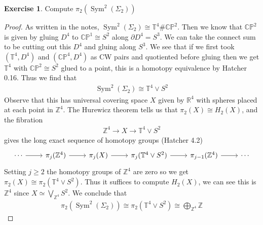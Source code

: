 \documentclass[10.5pt]{article}
\theoremstyle{definition}
\newtheorem{pb}{Exercise}
\numberwithin{proposition}{subsection}
\numberwithin{pb}{subsection}
\begin{document}
    \begin{pb}
        Compute \(\pi_2(\operatorname{Sym}^2(\Sigma_2))\)

        \begin{proof}
            As written in the notes, \(\operatorname{Sym}^2(\Sigma_2) \cong \mathbb{T}^4 \# \mathbb{CP}^2\). Then we know that \(\mathbb{CP}^2\) is given by gluing \(D^4\) to \(\mathbb{CP}^1 \cong S^2\) along \(\partial D^4 = S^3\). We can take the connect sum to be cutting out this \(D^4\) and gluing along \(S^3\). We see that if we first took \((\mathbb{T}^4,D^4)\) and \((\mathbb{CP}^4,D^4)\) as CW pairs and quotiented before gluing then we get \(\mathbb{T}^4\) with \(\mathbb{CP}^2 \cong S^2\) glued to a point, this is a homotopy equivalence by Hatcher 0.16. Thus we find that
            \begin{align}
                \operatorname{Sym}^2(\Sigma_2) \cong \mathbb{T}^4 \vee S^2
            \end{align}
            Observe that this has universal covering space \(X\) given by \(\mathbb{R}^4\) with spheres placed at each point in \(\mathbb{Z}^4\). The Hurewicz theorem tells us that \(\pi_2(X) \cong H_2(X)\), and the fibration
            \begin{align}
                \mathbb{Z}^4 \to X \to \mathbb{T}^4 \vee S^2
            \end{align}
            gives the long exact sequence of homotopy groups (Hatcher 4.2)
            \begin{equation}
                \begin{tikzcd}
                \cdots \arrow[r] &\pi_j(\mathbb{Z}^4) \arrow[r] &\pi_j(X) \arrow[r] &\pi_j(\mathbb{T}^4 \vee S^2) \arrow[r] &\pi_{j-1}(\mathbb{Z}^4) \arrow[r] &\cdots
            \end{tikzcd}
            \end{equation}
            Setting \(j\geq2\) the homotopy groups of \(\mathbb{Z}^4\) are zero so we get \(\pi_2(X) \cong \pi_2(\mathbb{T}^4 \vee S^2)\). Thus it suffices to compute \(H_2(X)\), we can see this is \(\mathbb{Z}^4\) since \(X \simeq \bigvee_{\mathbb{Z}^4}S^2\). We conclude that
            \begin{align}
                \pi_2(\operatorname{Sym}^2(\Sigma_2)) \cong \pi_2(\mathbb{T}^4 \vee S^2) \cong \bigoplus_{\mathbb{Z}^4}\mathbb{Z}
            \end{align}
        \end{proof}
    \end{pb}
\end{document}
